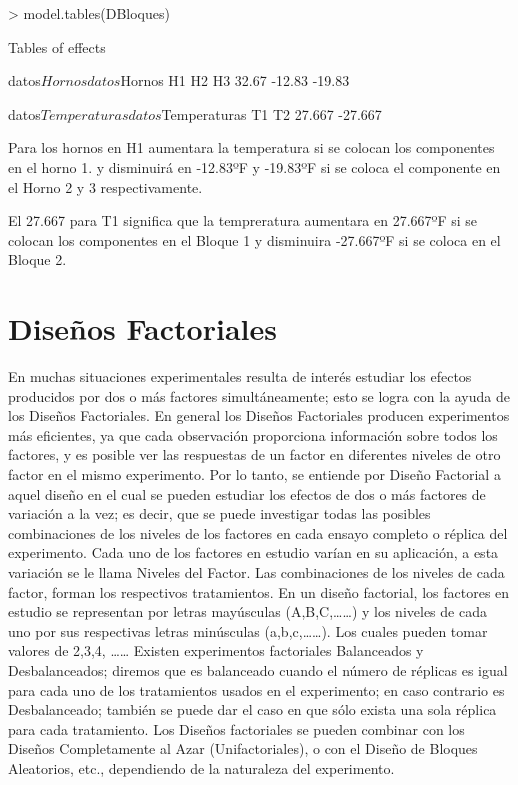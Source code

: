 \documentclass[12pt,letterpaper]{report}
\begin{document}
\begin{Schunk}
\begin{Sinput}
> model.tables(DBloques)
\end{Sinput}
\begin{Soutput}
Tables of effects

 datos$Hornos 
datos$Hornos
    H1     H2     H3 
 32.67 -12.83 -19.83 

 datos$Temperaturas 
datos$Temperaturas
     T1      T2 
 27.667 -27.667 
\end{Soutput}
\end{Schunk}
Para los hornos en H1 aumentara la temperatura si se colocan los componentes en el horno 1. y disminuirá en -12.83ºF y -19.83ºF si se coloca el componente en el Horno 2 y 3 respectivamente. 

El 27.667 para T1 significa que la tempreratura aumentara en 27.667ºF si se colocan los componentes en el Bloque 1 y disminuira -27.667ºF si se coloca en el Bloque 2.

\chapter*{Diseños Factoriales}
En muchas situaciones experimentales resulta de interés estudiar los efectos producidos
por dos o más factores simultáneamente; esto se logra con la ayuda de los Diseños Factoriales.
En general los Diseños Factoriales producen experimentos más eficientes, ya que cada
observación proporciona información sobre todos los factores, y es posible ver las respuestas
de un factor en diferentes niveles de otro factor en el mismo experimento. Por lo tanto, se
entiende por Diseño Factorial a aquel diseño en el cual se pueden estudiar los efectos de dos
o más factores de variación a la vez; es decir, que se puede investigar todas las posibles
combinaciones de los niveles de los factores en cada ensayo completo o réplica del
experimento.
Cada uno de los factores en estudio varían en su aplicación, a esta variación se le llama
Niveles del Factor. Las combinaciones de los niveles de cada factor, forman los respectivos
tratamientos.
En un diseño factorial, los factores en estudio se representan por letras mayúsculas
(A,B,C,……) y los niveles de cada uno por sus respectivas letras minúsculas (a,b,c,……). Los
cuales pueden tomar valores de 2,3,4, ……
Existen experimentos factoriales Balanceados y Desbalanceados; diremos que es
balanceado cuando el número de réplicas es igual para cada uno de los tratamientos usados en
el experimento; en caso contrario es Desbalanceado; también se puede dar el caso en que sólo
exista una sola réplica para cada tratamiento. Los Diseños factoriales se pueden combinar con
los Diseños Completamente al Azar (Unifactoriales), o con el Diseño de Bloques Aleatorios, etc.,
dependiendo de la naturaleza del experimento.
\end{document}
